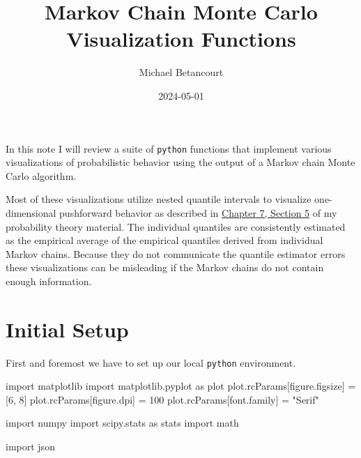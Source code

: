 \documentclass[
  letterpaper,
  DIV=11,
  numbers=noendperiod]{scrartcl}
\title{Markov Chain Monte Carlo Visualization Functions}
\author{Michael Betancourt}
\date{2024-05-01}
\newenvironment{Shaded}{\begin{snugshade}}{\end{snugshade}}
\newcommand{\DecValTok}[1]{\textcolor[rgb]{0.68,0.00,0.00}{#1}}
\newcommand{\ImportTok}[1]{\textcolor[rgb]{0.00,0.46,0.62}{#1}}
\newcommand{\NormalTok}[1]{\textcolor[rgb]{0.00,0.23,0.31}{#1}}
\newcommand{\OperatorTok}[1]{\textcolor[rgb]{0.37,0.37,0.37}{#1}}
\newcommand{\StringTok}[1]{\textcolor[rgb]{0.13,0.47,0.30}{#1}}
\renewcommand*\contentsname{Table of contents}
\newcommand\contentsname{Table of contents}
\begin{document}
\maketitle

\renewcommand*\contentsname{Table of contents}
{
\hypersetup{linkcolor=}
\setcounter{tocdepth}{3}
\tableofcontents
}
In this note I will review a suite of \texttt{python} functions that
implement various visualizations of probabilistic behavior using the
output of a Markov chain Monte Carlo algorithm.

Most of these visualizations utilize nested quantile intervals to
visualize one-dimensional pushforward behavior as described in
\href{https://betanalpha.github.io/assets/chapters_html/transforming_probability_spaces.html\#sec:1d-pushforward-characterizations}{Chapter
7, Section 5} of my probability theory material. The individual
quantiles are consistently estimated as the empirical average of the
empirical quantiles derived from individual Markov chains. Because they
do not communicate the quantile estimator errors these visualizations
can be misleading if the Markov chains do not contain enough
information.

\section{Initial Setup}\label{initial-setup}

First and foremost we have to set up our local \texttt{python}
environment.

\begin{Shaded}
\begin{Highlighting}[]
\ImportTok{import}\NormalTok{ matplotlib}
\ImportTok{import}\NormalTok{ matplotlib.pyplot }\ImportTok{as}\NormalTok{ plot}
\NormalTok{plot.rcParams[}\StringTok{\textquotesingle{}figure.figsize\textquotesingle{}}\NormalTok{] }\OperatorTok{=}\NormalTok{ [}\DecValTok{6}\NormalTok{, }\DecValTok{8}\NormalTok{]}
\NormalTok{plot.rcParams[}\StringTok{\textquotesingle{}figure.dpi\textquotesingle{}}\NormalTok{] }\OperatorTok{=} \DecValTok{100}
\NormalTok{plot.rcParams[}\StringTok{\textquotesingle{}font.family\textquotesingle{}}\NormalTok{] }\OperatorTok{=} \StringTok{"Serif"}

\ImportTok{import}\NormalTok{ numpy}
\ImportTok{import}\NormalTok{ scipy.stats }\ImportTok{as}\NormalTok{ stats}
\ImportTok{import}\NormalTok{ math}

\ImportTok{import}\NormalTok{ json}
\end{Highlighting}
\end{Shaded}
\end{document}
